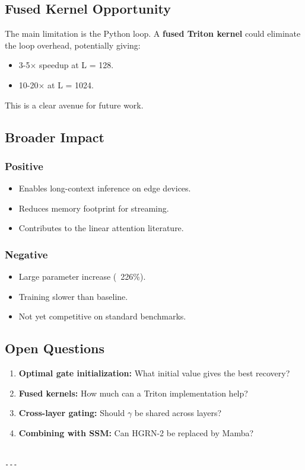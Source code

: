 \subsection{Fused Kernel Opportunity}

The main limitation is the Python loop. A \textbf{fused Triton kernel} could 
eliminate the loop overhead, potentially giving:

\begin{itemize}
\item 3-5$\times$ speedup at L = 128.
\item 10-20$\times$ at L = 1024.

\end{itemize}
This is a clear avenue for future work.

\subsection{Broader Impact}

\subsubsection{Positive}
\begin{itemize}
\item Enables long-context inference on edge devices.
\item Reduces memory footprint for streaming.
\item Contributes to the linear attention literature.

\end{itemize}
\subsubsection{Negative}
\begin{itemize}
\item Large parameter increase (~226\%).
\item Training slower than baseline.
\item Not yet competitive on standard benchmarks.

\end{itemize}
\subsection{Open Questions}

\begin{enumerate}
\item \textbf{Optimal gate initialization:} What initial value gives the best recovery?
\item \textbf{Fused kernels:} How much can a Triton implementation help?
\item \textbf{Cross-layer gating:} Should $\gamma$ be shared across layers?
\item \textbf{Combining with SSM:} Can HGRN-2 be replaced by Mamba?
\end{enumerate}
\begin{lstlisting}

---
\end{lstlisting}

